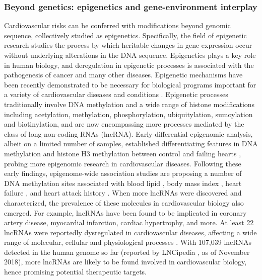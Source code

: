 \documentclass[letter]{bioinfo}
\begin{document}
\subsubsection*{Beyond genetics: epigenetics and gene-environment interplay}	
	Cardiovascular risks can be conferred with modifications beyond genomic sequence, collectively studied as epigenetics. Specifically, the field of epigenetic research studies the process by which heritable changes in gene expression occur without underlying alterations in the DNA sequence. Epigenetics plays a key role in human biology, and deregulation in epigenetic processes is associated with the pathogenesis of cancer and many other diseases. Epigenetic mechanisms have been recently demonstrated to be necessary for biological programs important for a variety of cardiovascular diseases and conditions \citep{Udali:2013:Cardiovascular,AbiKhalil:2014:emerging,Muka:2016:role,Gidlof:2016:Ischemic}. Epigenetic processes traditionally involve DNA methylation and a wide range of histone modifications including acetylation, methylation, phosphorylation, ubiquitylation, sumoylation and biotinylation, and are now encompassing more processes mediated by the class of long non-coding RNAs (lncRNA). Early differential epigenomic analysis, albeit on a limited number of samples, established differentiating features in DNA methylation and histone H3 methylation between control and failing hearts \citep{Movassagh:2011:Distinct}, probing more epigenomic research in cardiovascular diseases. Following these early findings, epigenome-wide association studies are proposing a number of DNA methylation sites associated with blood lipid \citep{Irvin:2014:Epigenomewide}, body mass index \citep{Dick:2014:DNA, Wahl:2017:Epigenomewide}, heart failure \citep{Meder:2017:EpigenomeWide}, and heart attack history \citep{Rask-Andersen:2016:Epigenomewide}.
	When more lncRNAs were discovered and characterized, the prevalence of these molecules in cardiovascular biology also emerged. For example, lncRNAs have been found to be implicated in coronary artery disease, myocardial infarction, cardiac hypertrophy, and more. At least 22 lncRNAs were reportedly dysregulated in cardiovascular diseases, affecting a wide range of molecular, cellular and physiological processes \citep{Das:2018:Deciphering}. With 107,039 lncRNAs detected in the human genome so far (reported by LNCipedia \citep{Volders:2018:LNCipedia}, as of November 2018), more lncRNAs are likely to be found involved in cardiovascular biology, hence promising potential therapeutic targets.
\end{document}
